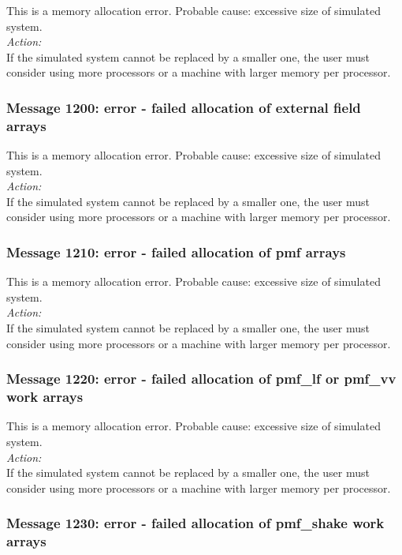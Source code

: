 This is a memory allocation error. Probable cause: excessive size of
simulated system. \\

\noindent
{\em Action:}\\
If the simulated system cannot be replaced by a smaller one, the user
must consider using more processors or a machine with larger memory
per processor.

\subsubsection*{Message 1200: error - failed allocation of external
field arrays}

This is a memory allocation error. Probable cause: excessive size of
simulated system. \\

\noindent
{\em Action:}\\
If the simulated system cannot be replaced by a smaller one, the user
must consider using more processors or a machine with larger memory
per processor.

\subsubsection*{Message 1210: error - failed allocation of pmf arrays}

This is a memory allocation error. Probable cause: excessive size of
simulated system. \\

\noindent
{\em Action:}\\
If the simulated system cannot be replaced by a smaller one, the user
must consider using more processors or a machine with larger memory
per processor.

\subsubsection*{Message 1220: error - failed allocation of pmf\_lf or
pmf\_vv work arrays}

This is a memory allocation error. Probable cause: excessive size of
simulated system. \\

\noindent
{\em Action:}\\
If the simulated system cannot be replaced by a smaller one, the user
must consider using more processors or a machine with larger memory
per processor.

\subsubsection*{Message 1230: error - failed allocation of pmf\_shake
work arrays}

